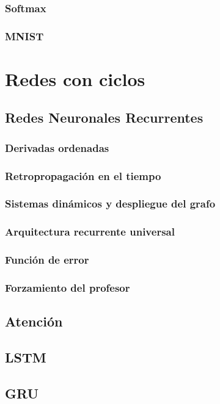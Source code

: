 \documentclass[12pt,openany]{book}
\begin{document}
\section{Softmax}
\section{MNIST}

\part{Redes con ciclos}
\chapter{Redes Neuronales Recurrentes}
\section{Derivadas ordenadas}
\section{Retropropagación en el tiempo}
\section{Sistemas dinámicos y despliegue del grafo}
\section{Arquitectura recurrente universal}
\section{Función de error}
\section{Forzamiento del profesor}

\chapter{Atención}
\chapter{LSTM}
\chapter{GRU}
\end{document}
